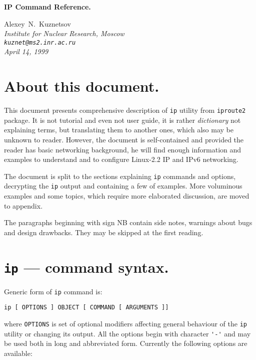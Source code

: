 \def\TITLE{IP Command Reference}

\begin{center}
\Large\bf IP Command Reference.
\end{center}


\begin{center}
{ \large Alexey~N.~Kuznetsov } \\
\em Institute for Nuclear Research, Moscow \\
\verb|kuznet@ms2.inr.ac.ru| \\
\rm April 14, 1999
\end{center}

\vspace{5mm}

\tableofcontents

\newpage

\section{About this document.}

This document presents comprehensive description of \verb|ip| utility
from \verb|iproute2| package. It is not tutorial and even not user guide,
it is rather {\em dictionary\/} not explaining terms,
but translating them to another ones, which also may be unknown to reader.
However, the document is self-contained and provided the reader has 
basic networking background, he will find enough information
and examples to understand and to configure Linux-2.2 IP and IPv6
networking.

The document is split to the sections explaining \verb|ip| commands
and options, decrypting the \verb|ip| output and containing a few of examples.
More voluminous examples and some topics, which require more elaborated
discussion, are moved to appendix.

The paragraphs beginning with sign NB contain side notes, warnings about
bugs and design drawbacks. They may be skipped at the first reading.

\section{{\tt ip} --- command syntax.}

Generic form of \verb|ip| command is:
\begin{verbatim}
ip [ OPTIONS ] OBJECT [ COMMAND [ ARGUMENTS ]]
\end{verbatim}
where \verb|OPTIONS| is set of optional modifiers affecting
general behaviour of the \verb|ip| utility or changing its output. All the options
begin with character \verb|'-'| and may be used both in long and abbreviated 
form. Currently the following options are available:

